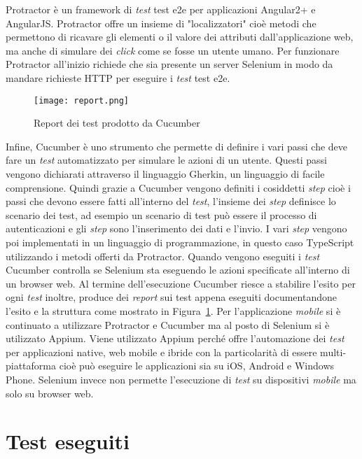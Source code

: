 Protractor è un framework di \emph{test} \gls{test e2e} per applicazioni Angular2+ e AngularJS. Protractor offre un insieme di "localizzatori" cioè metodi che permettono di ricavare gli elementi o il valore dei attributi dall'applicazione web, ma anche di simulare dei \emph{click} come se fosse un utente umano. Per funzionare Protractor all'inizio richiede che sia presente un server Selenium in modo da mandare richieste HTTP per eseguire i \emph{test} \gls{test e2e}.

\begin{figure}[h] 
	\begin{center}
		\texttt{[image: report.png]}
		\caption{Report dei test prodotto da Cucumber}\label{fig:testDoc}
	\end{center}
\end{figure}

Infine, Cucumber è uno strumento che permette di definire i vari passi che deve fare un \emph{test} automatizzato per simulare le azioni di un utente. Questi passi vengono dichiarati attraverso il linguaggio Gherkin, un linguaggio di facile comprensione. Quindi grazie a Cucumber vengono definiti i cosiddetti \emph{step} cioè i passi che devono essere fatti all'interno del \emph{test}, l'insieme dei \emph{step} definisce lo scenario dei test, ad esempio un scenario di test può essere il processo di autenticazioni e gli \emph{step} sono l'inserimento dei dati e l'invio. I vari \emph{step} vengono poi implementati in un linguaggio di programmazione, in questo caso TypeScript utilizzando i metodi offerti da Protractor. Quando vengono eseguiti i \emph{test} Cucumber controlla se Selenium sta eseguendo le azioni specificate all’interno di un browser web. Al termine dell'esecuzione Cucumber riesce a stabilire l'esito per ogni \emph{test} inoltre, produce dei \emph{report} sui test appena eseguiti documentandone l'esito e la struttura come mostrato in Figura~\ref{fig:testDoc}.
\clearpage
Per l'applicazione \emph{mobile} si è continuato a utilizzare Protractor e Cucumber ma al posto di Selenium si è utilizzato Appium. Viene utilizzato Appium perché offre l'automazione dei \emph{test} per applicazioni native, web mobile e ibride con la particolarità di essere multi-piattaforma cioè può eseguire le applicazioni sia su iOS, Android e Windows Phone. Selenium invece non permette l'esecuzione di \emph{test} su dispositivi \emph{mobile} ma solo su browser web.

\section{Test eseguiti}
